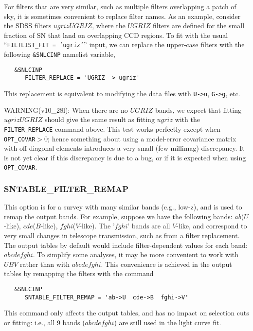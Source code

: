 \documentclass[12pt]{article}
\begin{document}
For filters that are very similar, such as multiple filters
overlapping a patch of sky, it is sometimes convenient
to replace filter names. As an example, consider the SDSS filters
$ugrizUGRIZ$, where the $UGRIZ$ filters are defined for the 
small fraction of SN that land on overlapping CCD regions. 
To fit with the usual ``{\tt FILTLIST\_FIT = 'ugriz'}'' input,
we can replace the upper-case filters with the
following {\tt \&SNLCINP} namelist variable,
%
\begin{verbatim}
   &SNLCINP
      FILTER_REPLACE = 'UGRIZ -> ugriz'
\end{verbatim}
%
This replacement is equivalent to modifying the data
files with {\tt U->u}, {\tt G->g}, etc.


\bigskip
WARNING(v10\_28l): 
When there are no $UGRIZ$ bands, we expect that fitting $ugrizUGRIZ$ 
should give the same result as fitting $ugriz$ with the 
{\tt FILTER\_REPLACE} command above. This test works perfectly 
except when  {\tt OPT\_COVAR}$>0$; 
hence something about using a model-error covariance matrix 
with off-diagonal elements introduces a very small 
(few millimag) discrepancy. It is not yet clear
if this discrepancy is due to a bug, or if it is expected
when using {\tt OPT\_COVAR}.


  \subsubsection{SNTABLE\_FILTER\_REMAP}
  \label{sss:filter_remap}

This option is for a survey with many similar bands (e.g., low-z),
and is used to remap the output bands. For example, suppose we
have the following bands: 
$ab$($U$-like), $cde$($B$-like), $fghi$($V$-like).
The '$fghi$' bands are all $V$-like, and correspond to very small 
changes in telescope transmission, such as from a filter replacement.
The output tables by default would include filter-dependent
values for each band: $abcdefghi$.  
To simplify some analyses, it may be more convenient to work
with $UBV$ rather than with $abcdefghi$.  
This convenience is achieved in the output tables
by remapping the filters with the command
\begin{verbatim}
   &SNLCINP
      SNTABLE_FILTER_REMAP = 'ab->U  cde->B  fghi->V'
\end{verbatim}
%
This command only affects the output tables, and has
no impact on selection cuts or fitting: 
i.e., all 9 bands ($abcdefghi$) are still
used in the light curve fit. 
\end{document}
